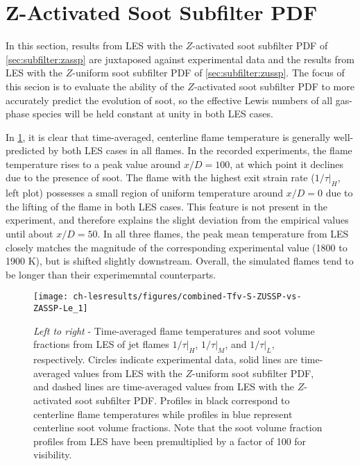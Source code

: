 \section{Z-Activated Soot Subfilter PDF}
\label{sec:lesresults:zassp}

In this section, results from LES with the $Z$-activated soot subfilter PDF of \cref{sec:subfilter:zassp} are juxtaposed against experimental data and the results from LES with the $Z$-uniform soot subfilter PDF of \cref{sec:subfilter:zussp}. The focus of this secion is to evaluate the ability of the $Z$-activated soot subfilter PDF to more accurately predict the evolution of soot, so the effective Lewis numbers of all gas-phase species will be held constant at unity in both LES cases.  

In \cref{fig:lesresults:zassp:ctrlineleseval}, it is clear that time-averaged, centerline flame temperature is generally well-predicted by both LES cases in all flames. In the recorded experiments, the flame temperature rises to a peak value around $x/D = 100$, at which point it declines due to the presence of soot. The flame with the highest exit strain rate ($1/\tau|_H$, left plot) possesses a small region of uniform temperature around $x/D = 0$ due to the lifting of the flame in both LES cases. This feature is not present in the experiment, and therefore explains the slight deviation from the empirical values until about $x/D = 50$. In all three flames, the peak mean temperature from LES closely matches the magnitude of the corresponding experimental value (1800 to 1900 K), but is shifted slightly downstream. Overall, the simulated flames tend to be longer than their experimemntal counterparts.

\begin{figure}[htb]
  \centering
  \texttt{[image: ch-lesresults/figures/combined-Tfv-S-ZUSSP-vs-ZASSP-Le\_1]}
  \caption[Centerline \texorpdfstring{$\langle T \rangle$}{<T>} \& \texorpdfstring{$\langle f_V \rangle$}{<fV>} from LES with \texorpdfstring{$Z$}{Z}-Activated Soot Subfilter PDF]{\textit{Left to right} - Time-averaged flame temperatures and soot volume fractions from LES of jet flames $1/\tau|_H$, $1/\tau|_M$, and $1/\tau|_L$, respectively. Circles indicate experimental data, solid lines are time-averaged values from LES with the $Z$-uniform soot subfilter PDF, and dashed lines are time-averaged values from LES with the $Z$-activated soot subfilter PDF. Profiles in black correspond to centerline flame temperatures while profiles in blue represent centerline soot volume fractions. Note that the soot volume fraction profiles from LES have been premultiplied by a factor of 100 for visibility.}
  \label{fig:lesresults:zassp:ctrlineleseval}
\end{figure}

